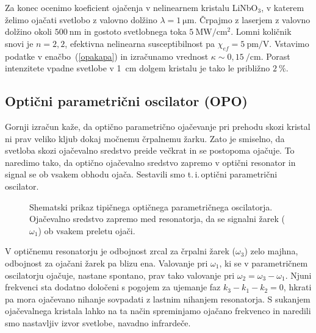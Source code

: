 Za konec ocenimo koeficient ojačenja v nelinearnem kristalu 
LiNbO$_{3}$, v katerem želimo
ojačati svetlobo z valovno dolžino $\lambda = 1~\si{\micro\metre}$. Črpajmo z laserjem z valovno dolžino 
okoli $500~\si{\nano\metre}$ in gostoto svetlobnega toka $5~\si{\mega\watt}/\si{\centi\metre}^{2}$. Lomni količnik snovi je 
$n = 2,2$, efektivna nelinearna susceptibilnost pa  $\chi_{ef} = 5~\si{\pico\metre}/\si{\volt}$. Vstavimo podatke v enačbo~(\ref{opakapa}) in izračunamo vrednost
$\kappa \sim 0,15~/\si{\centi\metre}$. Porast intenzitete vpadne svetlobe v 1~cm dolgem kristalu je 
tako le približno $2~\%$. 

\subsection*{Optični parametrični oscilator (OPO)}
Gornji izračun kaže, da optično parametrično ojačevanje pri prehodu skozi kristal ni prav veliko
kljub dokaj močnemu črpalnemu žarku. Zato je smiselno, da svetloba skozi ojačevalno 
sredstvo preide večkrat in se postopoma ojačuje. To naredimo tako, 
da optično ojačevalno sredstvo zapremo v optični 
resonator
in signal se ob vsakem obhodu ojača. Sestavili smo t.\,i.\,optični parametrični oscilator. 
\begin{figure}[h]
\centering
\def\svgwidth{100truemm} 

\caption{Shematski prikaz tipičnega optičnega parametričnega oscilatorja. Ojačevalno sredstvo
zapremo med resonatorja, da se signalni žarek ($\omega_1$) ob vsakem preletu ojači.}
\label{fig:opo}
\end{figure}

V optičnemu resonatorju je odbojnost zrcal za črpalni žarek ($\omega_3$) zelo majhna, 
odbojnost za ojačani žarek pa blizu ena. Valovanje pri $\omega_1$,
ki se v parametričnem oscilatorju ojačuje, nastane spontano, prav tako valovanje pri 
$\omega_2 = \omega_3 -\omega_1$. Njuni frekvenci sta dodatno določeni s pogojem za 
ujemanje faz $ k_3 - k_1 - k_2 = 0$, 
hkrati pa mora ojačevano nihanje sovpadati z lastnim nihanjem resonatorja. 
S sukanjem ojačevalnega kristala lahko na ta način spreminjamo
ojačano frekvenco in naredili smo nastavljiv izvor svetlobe, navadno infrardeče. 

